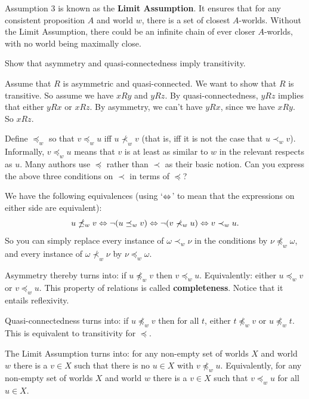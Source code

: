 Assumption 3 is known as the \textbf{Limit Assumption}. It ensures that for any
consistent proposition $A$ and world $w$, there is a set of closest $A$-worlds.
Without the Limit Assumption, there could be an infinite chain of ever closer
$A$-worlds, with no world being maximally close.


\begin{exercise}
  Show that asymmetry and quasi-connectedness imply transitivity.
\end{exercise}
\begin{solution}
  Assume that $R$ is asymmetric and quasi-connected. We want to show that
  $R$ is transitive. So assume we have $xRy$ and $yRz$. By quasi-connectedness,
  $yRz$ implies that either $yRx$ or $xRz$. By asymmetry, we can't have $yRx$,
  since we have $xRy$. So $xRz$.
\end{solution}

\begin{exercise}
  Define $\preceq_{w}$ so that $v \preceq_w u$ iff $u \nprec_w v$ (that is, iff
  it is not the case that $u \prec_{w} v$). Informally, $v \preceq_w u$ means
  that $v$ is at least as similar to $w$ in the relevant respects as $u$. Many
  authors use $\preceq$ rather than $\prec$ as their basic notion. Can you
  express the above three conditions on $\prec$ in terms of $\preceq$?
\end{exercise}
\begin{solution}
  We have the following equivalences (using `$\Leftrightarrow$' to mean that the
  expressions on either side are equivalent):
  \[
    u \npreceq_w v \Leftrightarrow \neg (u \preceq_w v) \Leftrightarrow \neg(v \nprec_w u) \Leftrightarrow v \prec_w u.
  \]
  So you can simply replace every instance of $\omega \prec_{w} \nu$ in the
  conditions by $\nu \npreceq_{w} \omega$, and every instance of
  $\omega \nprec_{w} \nu$ by $\nu \preceq_{w} \omega$.

  Asymmetry thereby turns into: if $u \npreceq_{w} v$ then $v \preceq_{w} u$.
  Equivalently: either $u \preceq_{w} v$ or $v \preceq_{w} u$. This
  property of relations is called \textbf{completeness}. Notice that it
  entails reflexivity.

  Quasi-connectedness turns into: if $u \npreceq_{w} v$ then for all $t$, either
  $t \npreceq_{w} v$ or $u \npreceq_{w} t$. This is equivalent to transitivity
  for $\preceq$.


  The Limit Assumption turns into: for any non-empty set of worlds $X$ and world
  $w$ there is a $v\in X$ such that there is no $u \in X$ with
  $v \npreceq_{w} u$. Equivalently, for any non-empty set of worlds $X$
  and world $w$ there is a $v\in X$ such that $v \preceq_{w} u$ for all $u\in X$.
\end{solution}

